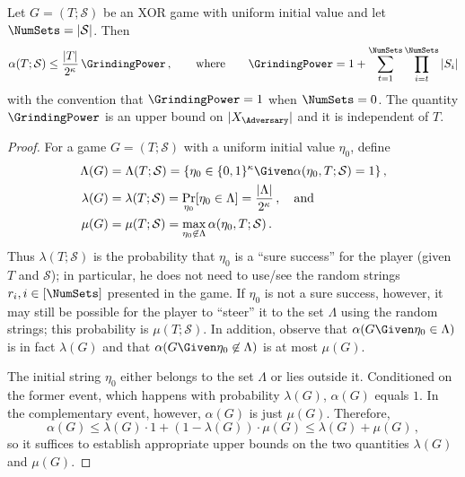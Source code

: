 \begin{theorem}\label{thm:xor-game-basic}
  Let $G = (T;  \mathcal{S})$ be an XOR
  game with uniform initial value and let $\NumSets = |\mathcal{S}|$. Then
  \begin{equation}\label{eq:basic-XOR-bound}
    \alpha(T;  \mathcal{S}) \leq \frac{|T|}{2^\kappa}\, \GrindingPower\,,
    \qquad\text{where}\qquad
    \GrindingPower = 1 + \sum_{t=1}^{\NumSets}
      \prod_{i = t}^{\NumSets} |S_i|
  \end{equation}
  with the convention that $\GrindingPower = 1$ when $\NumSets = 0$.
  The quantity $\GrindingPower$ is an upper bound on $|X_\Adversary|$ and it is independent of $T$.
\end{theorem}

\begin{proof}
  For a game $G = (T;  \mathcal{S})$ with a uniform initial value $\eta_0$, define
  \begin{align*}
    \Lambda(G) &= \Lambda(T; \mathcal{S}) = \{ \eta_0 \in \{0,1\}^\kappa \Given \alpha(\eta_0, T; \mathcal{S}) = 1\}\,,\\
    \lambda(G) & = \lambda(T; \mathcal{S}) = \Pr_{\eta_0}[\eta_0 \in \Lambda] = \frac{|\Lambda|}{2^\kappa}\,,\quad\text{and}\\
    \mu(G) &= \mu(T; \mathcal{S}) = \max_{\eta_0 \not\in \Lambda} \alpha(\eta_0, T;  \mathcal{S})\,.
  \end{align*}
  Thus $\lambda(T; \mathcal{S})$ is the probability that $\eta_0$
  is a ``sure success'' for the player (given $T$ and $\mathcal{S}$); in particular, he 
  does not need to use/see the random strings $r_i, i \in [\NumSets]$ presented in the game. 
  If $\eta_0$ is not a sure success, however, 
  it may still be possible for the player to ``steer'' it to the set $\Lambda$ using 
  the random strings; this probability is $\mu(T; \mathcal{S})$. 
  In addition, observe that $\alpha(G \Given \eta_0 \in \Lambda)$ is in fact $\lambda(G)$ 
  and that $\alpha(G \Given \eta_0 \not \in \Lambda)$ is at most $\mu(G)$.
  
  
  The initial string $\eta_0$ either belongs to the set $\Lambda$ or lies outside it. 
  Conditioned on the former event, which happens with probability $\lambda(G)$, $\alpha(G)$ equals $1$. 
  In the complementary event, however, 
  $\alpha(G)$ is just $\mu(G)$.
  Therefore, 
  \[
    \alpha(G) \leq \lambda(G)\cdot 1 + (1 - \lambda(G)) \cdot \mu(G) \leq \lambda(G) + \mu(G)\,,
  \]
  so it suffices to establish appropriate upper bounds on the two
  quantities $\lambda(G)$ and $\mu(G)$. 
  

\end{proof}
